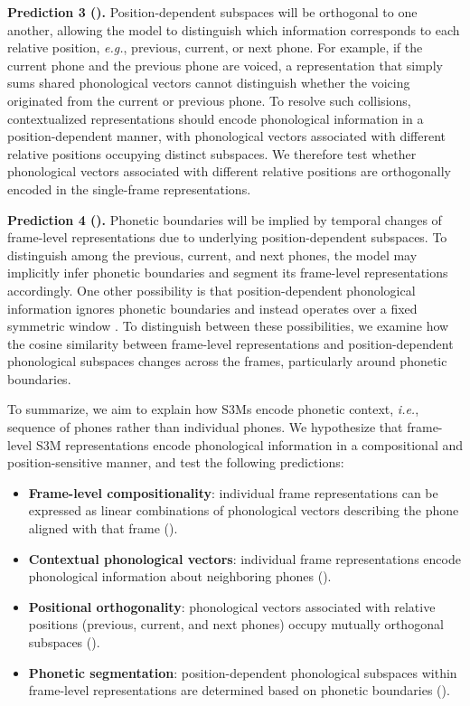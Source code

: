 \documentclass[cameraready]{Interspeech}
\begin{document}
\textbf{Prediction 3 ().}
Position-dependent subspaces will be orthogonal to one another, allowing the model to distinguish which information corresponds to each relative position, \textit{e.g.}, previous, current, or next phone.
For example, if the current phone and the previous phone are voiced, a representation that simply sums shared phonological vectors cannot distinguish whether the voicing originated from the current or previous phone.
To resolve such collisions, contextualized representations should encode phonological information in a position-dependent manner, with phonological vectors associated with different relative positions occupying distinct subspaces.
We therefore test whether phonological vectors associated with different relative positions are orthogonally encoded in the single-frame representations.


\textbf{Prediction 4 ().}
Phonetic boundaries will be implied by temporal changes of frame-level representations due to underlying position-dependent subspaces.
To distinguish among the previous, current, and next phones, the model may implicitly infer phonetic boundaries and segment its frame-level representations accordingly.
One other possibility is that position-dependent phonological information ignores phonetic boundaries and instead operates over a fixed symmetric window \cite{meng25b_interspeech,choi2025device}.
To distinguish between these possibilities, we examine how the cosine similarity between frame-level representations and position-dependent phonological subspaces changes across the frames, particularly around phonetic boundaries.


To summarize, we aim to explain how S3Ms encode phonetic context, \textit{i.e.}, sequence of phones rather than individual phones.
We hypothesize that frame-level S3M representations encode phonological information in a compositional and position-sensitive manner, and test the following predictions:
\begin{itemize}
    \item \textbf{Frame-level compositionality}: individual frame representations can be expressed as linear combinations of phonological vectors describing the phone aligned with that frame ().
    \item \textbf{Contextual phonological vectors}: individual frame representations encode phonological information about neighboring phones ().
    \item \textbf{Positional orthogonality}: phonological vectors associated with relative positions (previous, current, and next phones) occupy mutually orthogonal subspaces ().
    \item \textbf{Phonetic segmentation}: position-dependent phonological subspaces within frame-level representations are determined based on phonetic boundaries ().
\end{itemize}
\end{document}
